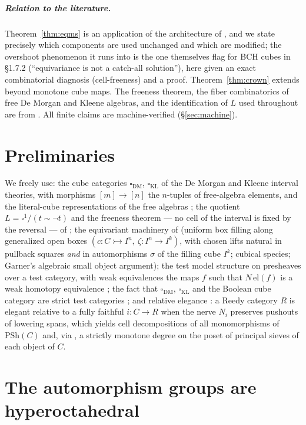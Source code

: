 \documentclass[11pt]{amsart}
\theoremstyle{definition}
\newcommand{\cube}{\square_{\mathrm{DM}}}
\newcommand{\cubeK}{\square_{\mathrm{KL}}}
\newcommand{\el}{\mathrm{el}}
\newcommand{\Ldash}{L}
\begin{document}
\subparagraph*{Relation to the literature.}  Theorem~\ref{thm:eqms}
is an application of the architecture of \cite{ACCRS}, and we state
precisely which components are used unchanged and which are
modified; the overshoot phenomenon it runs into is the one
\cite{ACCRS} themselves flag for BCH cubes in §1.7.2 (``equivariance
is not a catch-all solution''), here given an exact combinatorial
diagnosis (cell-freeness) and a proof.
Theorem~\ref{thm:crown} extends \cite[App.~A]{CavalloSattlerElegance}
beyond monotone cube maps.  The freeness theorem, the fiber
combinatorics of free De Morgan and Kleene algebras, and the
identification of $\Ldash$ used throughout are from
\cite{DMFibers, Kleene, Reversal}.  All finite claims are
machine-verified (\S\ref{sec:machine}).

\section{Preliminaries}
\label{sec:prelim}

We freely use: the cube categories $\cube$, $\cubeK$ of the De
Morgan and Kleene interval theories, with morphisms
$[m] \to [n]$ the $n$-tuples of free-algebra elements, and the
literal-cube representations of the free algebras
\cite{DMFibers, Kleene}; the quotient
$\Ldash = \square^1/(t \sim \neg t)$ and the freeness theorem ---
no cell of the interval is fixed by the reversal --- of
\cite{Reversal}; the equivariant machinery of \cite{ACCRS}
(uniform box filling along generalized open boxes
$(c : C \rightarrowtail I^n,\ \zeta : I^n \to I^k)$, with chosen
lifts natural in pullback squares \emph{and} in automorphisms
$\sigma$ of the filling cube $I^k$; cubical species; Garner's
algebraic small object argument); the test model structure on
presheaves over a test category, with weak equivalences the maps
$f$ such that $N\,\el(f)$ is a weak homotopy equivalence
\cite{Cisinski, ACCRS}; the fact that $\cube$, $\cubeK$ and the
Boolean cube category are strict test categories
\cite{BuchholtzMorehouse}; and relative elegance
\cite{CavalloSattlerElegance}: a Reedy category $R$ is elegant
relative to a fully faithful $i : C \to R$ when the nerve
$N_i$ preserves pushouts of lowering spans, which yields cell
decompositions of all monomorphisms of $\mathrm{PSh}(C)$ and, via
\cite[Lem.~A.5]{CavalloSattlerElegance}, a strictly monotone
degree on the poset of principal sieves of each object of $C$.

\section{The automorphism groups are hyperoctahedral}
\label{sec:aut}
\end{document}
